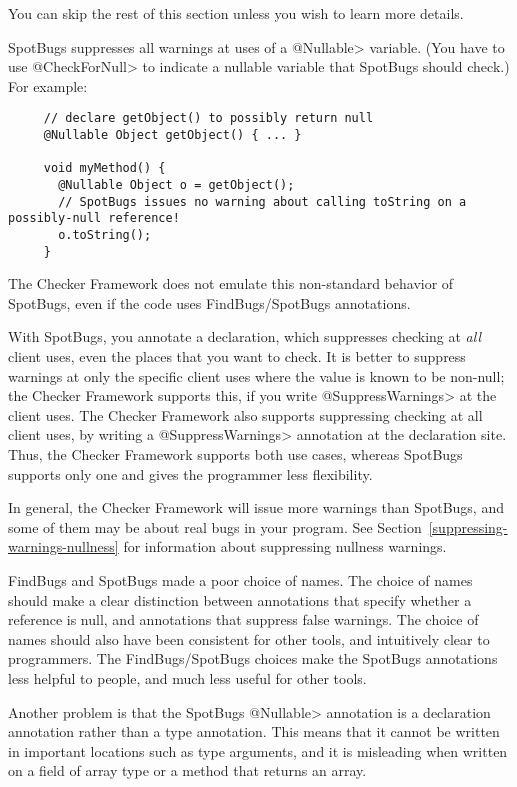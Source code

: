 You can skip the rest of this section unless you wish to learn more details.

SpotBugs suppresses all warnings at uses of a \<@Nullable> variable.
(You have to use \<@CheckForNull> to
indicate a nullable variable that SpotBugs should check.)  For example:

\begin{Verbatim}
     // declare getObject() to possibly return null
     @Nullable Object getObject() { ... }

     void myMethod() {
       @Nullable Object o = getObject();
       // SpotBugs issues no warning about calling toString on a possibly-null reference!
       o.toString();
     }
\end{Verbatim}

\noindent
The Checker Framework does not emulate this non-standard behavior of
SpotBugs, even if the code uses FindBugs/SpotBugs annotations.

With SpotBugs, you annotate a declaration, which suppresses checking at
\emph{all} client uses, even the places that you want to check.
It is better to suppress warnings at only the specific client uses
where the value is known to be non-null; the Checker Framework supports
this, if you write \<@SuppressWarnings> at the client uses.
The Checker Framework also supports suppressing checking at all client uses,
by writing a \<@SuppressWarnings> annotation at the declaration site.
Thus, the Checker Framework supports both use cases, whereas SpotBugs
supports only one and gives the programmer less flexibility.

In general, the Checker Framework will issue more warnings than SpotBugs,
and some of them may be about real bugs in your program.
See Section~\ref{suppressing-warnings-nullness} for information about
suppressing nullness warnings.

FindBugs and SpotBugs made a poor choice of names.  The choice of names should make a
clear distinction between annotations that specify whether a reference is
null, and annotations that suppress false warnings.  The choice of names
should also have been consistent for other tools, and intuitively clear to
programmers.  The FindBugs/SpotBugs choices make the SpotBugs annotations less
helpful to people, and much less useful for other tools.

Another problem is that the SpotBugs \<@Nullable> annotation is a
declaration annotation rather than a type annotation.  This means that it
cannot be written in important locations such as type arguments, and it is
misleading when written on a field of array type or a method that returns
an array.

